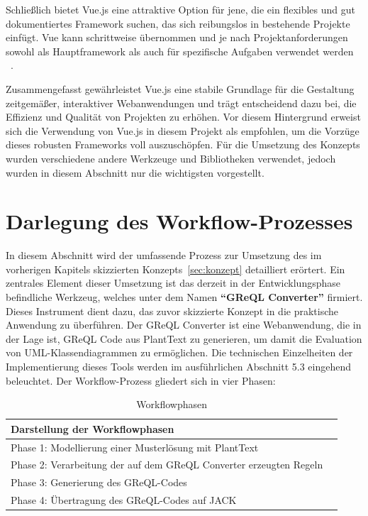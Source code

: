 Schließlich bietet Vue.js eine attraktive Option für jene, die ein flexibles und gut dokumentiertes Framework suchen,
das sich reibungslos in bestehende Projekte einfügt. Vue kann schrittweise übernommen und je nach Projektanforderungen
sowohl als Hauptframework als auch für spezifische Aufgaben verwendet werden ~\cite{wohlgethan2018supportingweb}.

Zusammengefasst gewährleistet Vue.js eine stabile Grundlage für die Gestaltung zeitgemäßer, interaktiver Webanwendungen
und trägt entscheidend dazu bei, die Effizienz und Qualität von Projekten zu erhöhen. Vor diesem Hintergrund erweist
sich die Verwendung von Vue.js in diesem Projekt als empfohlen, um die Vorzüge dieses robusten Frameworks voll
auszuschöpfen. Für die Umsetzung des Konzepts wurden verschiedene andere Werkzeuge und Bibliotheken verwendet, jedoch
wurden in diesem Abschnitt nur die wichtigsten vorgestellt.

\section{Darlegung des Workflow-Prozesses}

In diesem Abschnitt wird der umfassende Prozess zur Umsetzung des im vorherigen Kapitels skizzierten Konzepts~\ref{sec:konzept}
detailliert erörtert. Ein zentrales Element dieser Umsetzung ist das derzeit in der Entwicklungsphase befindliche
Werkzeug, welches unter dem Namen \textbf{``GReQL Converter''} firmiert. Dieses Instrument dient dazu, das zuvor skizzierte
Konzept in die praktische Anwendung zu überführen. Der GReQL Converter ist eine Webanwendung, die in der Lage ist,
GReQL Code aus PlantText zu generieren, um damit die Evaluation von UML-Klassendiagrammen zu ermöglichen. Die
technischen Einzelheiten der Implementierung dieses Tools werden im ausführlichen Abschnitt 5.3 eingehend beleuchtet.
Der Workflow-Prozess gliedert sich in vier Phasen:

\begin{table}[h!]
    \centering
    \caption{Workflowphasen}\label{tab:phasen}
    \begin{tabular}{ll}
        \toprule
        \textbf{Darstellung der Workflowphasen} \\
        \midrule
        Phase 1: Modellierung einer Musterlösung mit PlantText \\
        Phase 2: Verarbeitung der auf dem GReQL Converter erzeugten Regeln \\
        Phase 3: Generierung des GReQL-Codes \\
        Phase 4: Übertragung des GReQL-Codes auf JACK \\
        \bottomrule
    \end{tabular}
\end{table}

